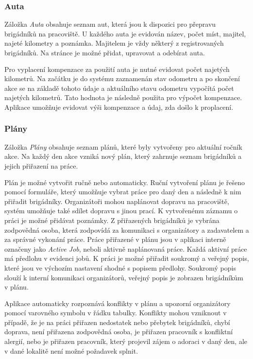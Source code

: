 \subsubsection{Auta}

Záložka \textit{Auta} obsahuje seznam aut, která jsou k dispozici pro přepravu brigádníků na pracoviště. U každého auta je evidován název, počet míst, majitel,
najeté kilometry a poznámka. Majitelem je vždy některý z registrovaných brigádníků. Na stránce je možné přidat, upravovat a odebírat auta.

Pro vyplacení kompenzace za použití auta je nutné evidovat počet najetých kilometrů. Na začátku je do systému zaznamenán stav odometru a po skončení akce
se na základě tohoto údaje a aktuálního stavu odometru vypočítá počet najetých kilometrů. Tato hodnota je následně použita pro výpočet kompenzace. Aplikace 
umožňuje evidovat výši kompenzace a údaj, zda došlo k proplacení.

\subsubsection{Plány}

Záložka \textit{Plány} obsahuje seznam plánů, které byly vytvořeny pro aktuální ročník akce. Na každý den akce vzniká nový plán, který zahrnuje
seznam brigádníků a jejich přiřazení na práce.

Plán je možné vytvořit ručně nebo automaticky. Ruční vytvoření plánu je řešeno pomocí formuláře, který umožňuje vybrat práce pro daný den a následně 
k nim přiřadit brigádníky. Organizátoři mohou naplánovat dopravu na pracoviště, systém umožňuje také sdílet dopravu s jinou prací. K vytvořenému záznamu
o práci je možné přidávat poznámky. Z přiřazených brigádníků je vybrána zodpovědná osoba, která zodpovídá za komunikaci s organizátory a zadavatelem a za správné vykonání práce.
Práce přiřazené v plánu jsou v aplikaci interně označeny jako \textit{Active Job}, neboli aktivně naplánovaná práce. Každá aktivní práce má předlohu v evidenci jobů.
K práci je možné přiřadit soukromý a veřejný popis, které jsou ve výchozím nastavení shodné s popisem předlohy. Soukromý popis slouží k interní komunikaci organizátorů,
veřejný popis je zobrazen brigádníkům v plánu.

Aplikace automaticky rozpoznává konflikty v plánu a upozorní organizátory pomocí varovného symbolu v řádku tabulky.
Konflikty mohou vzniknout v případě, že je na práci přiřazen nedostatek nebo přebytek brigádníků, 
chybí doprava, není přiřazena zodpovědná osoba, je přiřazen pracovník s konfliktní alergií, nebo je přiřazen pracovník, který projevil zájem o adoraci v daný den,
ale v dané lokalitě není možné požadavek splnit.

